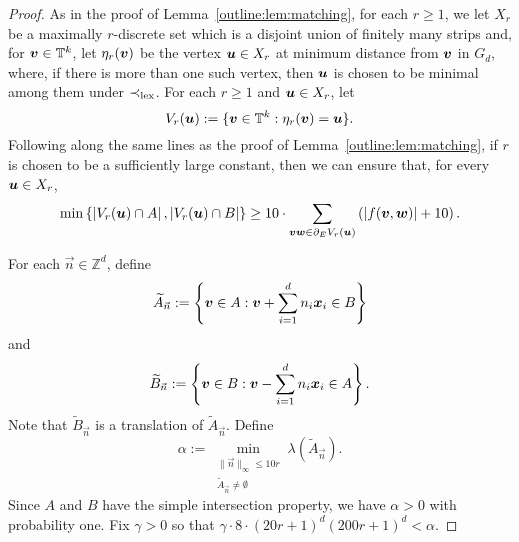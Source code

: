 \documentclass[12pt,a4paper]{amsart}
\numberwithin{equation}{section}
\theoremstyle{definition}
\begin{document}
\begin{proof}
As in the proof of Lemma~\ref{outline:lem:matching}, for each $r\geq1$, we let $X_r$ be a maximally $r$-discrete set which is a disjoint union of finitely many strips and, for $\boldsymbol{v}\in \mathbb{T}^k$, let $\eta_r(\boldsymbol{v})$ be the vertex $\boldsymbol{u}\in X_r$ at minimum distance from $\boldsymbol{v}$ in $G_d$, where, if there is more than one such vertex, then $\boldsymbol{u}$ is chosen to be minimal among them under $\prec_{\operatorname{lex}}$. For each $r\geq1$ and $\boldsymbol{u}\in X_r$, let
\[V_r(\boldsymbol{u}):=\{\boldsymbol{v}\in\mathbb{T}^k:\eta_r(\boldsymbol{v})=\boldsymbol{u}\}.\]
Following along the same lines as the proof of Lemma~\ref{outline:lem:matching}, if $r$ is chosen to be a sufficiently large constant, then we can ensure that, for every $\boldsymbol{u}\in X_r$, 
\begin{equation}\label{eq:enoughAB}\min\left\{\left|V_r(\boldsymbol{u})\cap A\right|,\left|V_r(\boldsymbol{u})\cap B\right|\right\}\geq 10\cdot\sum_{\boldsymbol{v}\boldsymbol{w}\in \partial_EV_r(\boldsymbol{u})}\left(|f(\boldsymbol{v},\boldsymbol{w})|+10\right).\end{equation}

For each $\vec{n}\in \mathbb{Z}^d$, define
\[\widetilde{A}_{\vec{n}}:=\left\{\boldsymbol{v}\in A: \boldsymbol{v}+\sum_{i=1}^dn_i\boldsymbol{x}_i\in B\right\}\]
and
\[\widetilde{B}_{\vec{n}}:=\left\{\boldsymbol{v}\in B: \boldsymbol{v}-\sum_{i=1}^dn_i\boldsymbol{x}_i\in A\right\}.\] 
Note that $\widetilde{B}_{\vec{n}}$ is a translation of $\widetilde{A}_{\vec{n}}$. Define
\[\alpha:= \min_{\substack{\|\vec{n}\|_\infty\leq 10r\\ \widetilde{A}_{\vec{n}}\neq\emptyset}} \lambda(\widetilde{A}_{\vec{n}}).\]
Since $A$ and $B$ have the simple intersection property, we have $\alpha>0$ with probability one. Fix $\gamma>0$ so that $\gamma\cdot8\cdot (20r+1)^{d}(200r+1)^{d}< \alpha$. 


\end{proof}
\end{document}

